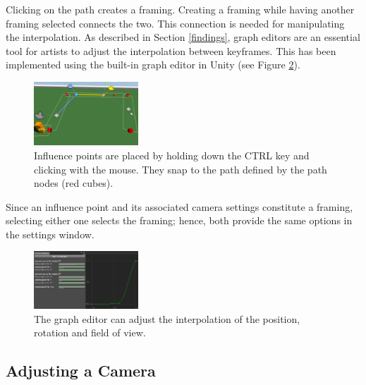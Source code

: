 Clicking on the path creates a framing. Creating a framing while having another framing selected connects the two. This connection is needed for manipulating the interpolation. As described in Section \ref{findings}, graph editors are an essential tool for artists to adjust the interpolation between keyframes. This has been implemented using the built-in graph editor in Unity (see Figure \ref{fig:curve}).

\begin{figure}[htbp]
\centering
\includegraphics[width=0.35\textwidth]{Pics/placingInfluencePoint}
\caption{Influence points are placed by holding down the CTRL key and clicking with the mouse. They snap to the path defined by the path nodes (red cubes).}
\label{fig:placingInfluencePoint}
\end{figure}


Since an influence point and its associated camera settings constitute a framing, selecting either one selects the framing; hence, both provide the same options in the settings window.

\begin{figure}[htbp]
\centering
\includegraphics[width=0.35\textwidth]{Pics/curve}
\caption{The graph editor can adjust the interpolation of the position, rotation and field of view.}
\label{fig:curve}
\end{figure}
\subsection{Adjusting a Camera}

